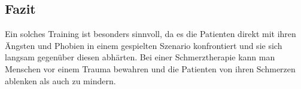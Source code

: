 \subsection{Fazit}
Ein solches Training ist besonders sinnvoll, da es die Patienten direkt mit ihren Ängsten und Phobien in einem gespielten Szenario konfrontiert und sie sich langsam gegenüber diesen abhärten. Bei einer Schmerztherapie kann man Menschen vor einem Trauma bewahren und die Patienten von ihren Schmerzen ablenken als auch zu mindern.





